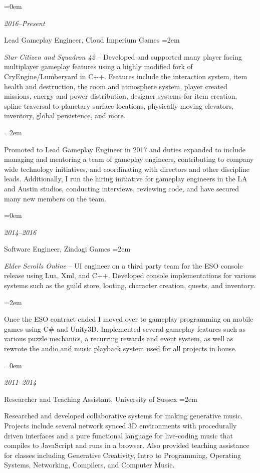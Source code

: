 \documentclass{scrartcl}
\newlength{\datebox}\settowidth{\datebox}{2011--Present} %
\newcommand{\NewEntry}[3]{\noindent\hangindent=0em\hangafter=0 \parbox{\datebox}{\small \textit{#1}} #2 #3 %
} %
\newcommand{\Description}[1]{\hangindent=2em\hangafter=0\noindent\raggedright\footnotesize{#1}\par\normalsize\vspace{1em}} %
\begin{document}
\begin{cv}{}
\NewEntry{2016--Present}{Lead Gameplay Engineer, Cloud Imperium Games}

\Description{\emph{Star Citizen and Squadron 42} -- Developed and supported many player facing multiplayer gameplay features using a highly modified fork of CryEngine/Lumberyard in C++. Features include the interaction system, item health and destruction, the room and atmosphere system, player created missions, energy and power distribution, designer systems for item creation, spline traversal to planetary surface locations, physically moving elevators, inventory, global persistence, and more.}
    
\Description{Promoted to Lead Gameplay Engineer in 2017 and duties expanded to include managing and mentoring a team of gameplay engineers, contributing to company wide technology initiatives, and coordinating with directors and other discipline leads. Additionally, I run the hiring initiative for gameplay engineers in the LA and Austin studios, conducting interviews, reviewing code, and have secured many new members on the team.}


\NewEntry{2014--2016}{Software Engineer, Zindagi Games}

\Description{\emph{Elder Scrolls Online} -- UI engineer on a third party team for the ESO console release using Lua, Xml, and C++. Developed console implementations for various systems such as the guild store, looting, character creation, quests, and inventory.}
\Description{Once the ESO contract ended I moved over to gameplay programming on mobile games using C\# and Unity3D. Implemented several gameplay features such as various puzzle mechanics, a recurring rewards and event system, as well as rewrote the audio and music playback system used for all projects in house.}


\NewEntry{2011--2014}{Researcher and Teaching Assistant, University of Sussex}

\Description{Researched and developed collaborative systems for making generative music. Projects include several network synced 3D environments with procedurally driven interfaces and a pure functional language for live-coding music that compiles to JavaScript and runs in a browser. Also provided teaching assistance for classes including Generative Creativity, Intro to Programming, Operating Systems, Networking, Compilers, and Computer Music.}


\end{cv}
\end{document}
